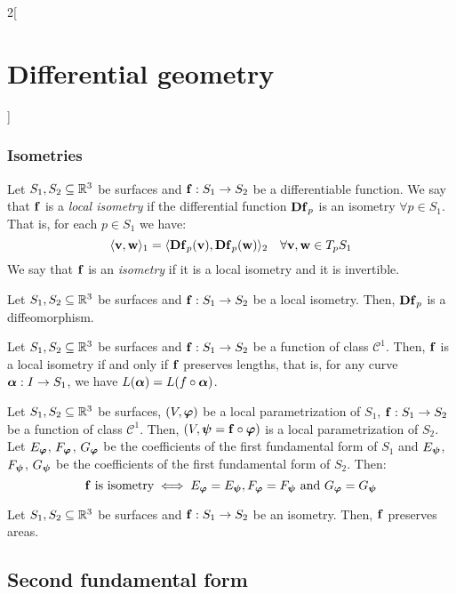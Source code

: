 \documentclass[../../../main.tex]{subfiles}
\begin{document}
\begin{multicols}{2}[\section{Differential geometry}]
  \subsubsection{Isometries}
  \begin{definition}
    Let $S_1,S_2\subseteq\mathbb{R}^3$ be surfaces and $\boldsymbol{\mathrm{f}}:S_1\rightarrow S_2$ be a differentiable function. We say that $\boldsymbol{\mathrm{f}}$ is a \emph{local isometry} if the differential function $\boldsymbol{\mathrm{Df}}_p$ is an isometry $\forall p\in S_1$. That is, for each $p\in S_1$ we have:
    $$\langle\boldsymbol{\mathrm{v}},\boldsymbol{\mathrm{w}}\rangle_1=\langle\boldsymbol{\mathrm{Df}}_p(\boldsymbol{\mathrm{v}}),\boldsymbol{\mathrm{Df}}_p(\boldsymbol{\mathrm{w}})\rangle_2\quad\forall\boldsymbol{\mathrm{v}},\boldsymbol{\mathrm{w}}\in T_pS_1$$
    We say that $\boldsymbol{\mathrm{f}}$ is an \emph{isometry} if it is a local isometry and it is invertible.
  \end{definition}
  \begin{proposition}
    Let $S_1,S_2\subseteq\mathbb{R}^3$ be surfaces and $\boldsymbol{\mathrm{f}}:S_1\rightarrow S_2$ be a local isometry. Then, $\boldsymbol{\mathrm{Df}}_p$ is a diffeomorphism.
  \end{proposition}
  \begin{proposition}
    Let $S_1,S_2\subseteq\mathbb{R}^3$ be surfaces and $\boldsymbol{\mathrm{f}}:S_1\rightarrow S_2$ be a function of class $\mathcal{C}^1$. Then, $\boldsymbol{\mathrm{f}}$ is a local isometry if and only if $\boldsymbol{\mathrm{f}}$ preserves lengths, that is, for any curve $\boldsymbol{\mathrm{\alpha}}:I\rightarrow S_1$, we have $L(\boldsymbol{\mathrm{\alpha}})=L(f\circ\boldsymbol{\mathrm{\alpha}})$.
  \end{proposition}
  \begin{proposition}
    Let $S_1,S_2\subseteq\mathbb{R}^3$ be surfaces, $(V,\boldsymbol{\mathrm{\varphi}})$ be a local parametrization of $S_1$, $\boldsymbol{\mathrm{f}}:S_1\rightarrow S_2$ be a function of class $\mathcal{C}^1$. Then, $(V,\boldsymbol{\mathrm{\psi}}=\boldsymbol{\mathrm{f}}\circ\boldsymbol{\mathrm{\varphi}})$ is a local parametrization of $S_2$. Let $E_{\boldsymbol{\mathrm{\varphi}}}$, $F_{\boldsymbol{\mathrm{\varphi}}}$, $G_{\boldsymbol{\mathrm{\varphi}}}$ be the coefficients of the first fundamental form of $S_1$ and $E_{\boldsymbol{\mathrm{\psi}}}$, $F_{\boldsymbol{\mathrm{\psi}}}$, $G_{\boldsymbol{\mathrm{\psi}}}$ be the coefficients of the first fundamental form of $S_2$. Then:
    $$\boldsymbol{\mathrm{f}}\text{ is isometry}\iff E_{\boldsymbol{\mathrm{\varphi}}}=E_{\boldsymbol{\mathrm{\psi}}}, F_{\boldsymbol{\mathrm{\varphi}}}=F_{\boldsymbol{\mathrm{\psi}}}\text{ and }G_{\boldsymbol{\mathrm{\varphi}}}=G_{\boldsymbol{\mathrm{\psi}}}$$
  \end{proposition}
  \begin{corollary}
    Let $S_1,S_2\subseteq\mathbb{R}^3$ be surfaces and $\boldsymbol{\mathrm{f}}:S_1\rightarrow S_2$ be an isometry. Then, $\boldsymbol{\mathrm{f}}$ preserves areas.
  \end{corollary}
  \subsection{Second fundamental form}

\end{multicols}
\end{document}
